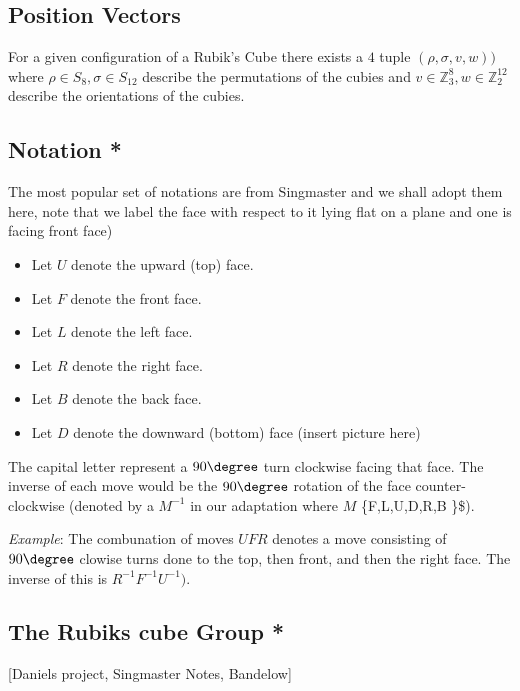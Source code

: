 \subsection{Position Vectors}\label{position-vectors}

For a given configuration of a Rubik's Cube there exists a \(4\) tuple
\((\rho, \sigma, v, w))\) where \(\rho \in S_8, \sigma \in S_{12}\)
describe the permutations of the cubies and
\(v \in \mathbb Z_3^8, w \in \mathbb Z_2^{12}\) describe the
orientations of the cubies.

\subsection{Notation *}\label{notation}

The most popular set of notations are from Singmaster and we shall adopt
them here, note that we label the face with respect to it lying flat on
a plane and one is facing front face)

\begin{itemize}
\tightlist
\item
  Let \(U\) denote the upward (top) face.
\item
  Let \(F\) denote the front face.
\item
  Let \(L\) denote the left face.
\item
  Let \(R\) denote the right face.
\item
  Let \(B\) denote the back face.
\item
  Let \(D\) denote the downward (bottom) face (insert picture here)
\end{itemize}

The capital letter represent a \(90\degree\) turn clockwise facing that
face. The inverse of each move would be the \(90\degree\) rotation of
the face counter-clockwise (denoted by a \(M^{-1}\) in our adaptation
where \(M\) \in \{F,L,U,D,R,B \}\$).

\emph{Example}: The combunation of moves \(UFR\) denotes a move
consisting of \(90\degree\) clowise turns done to the top, then front,
and then the right face. The inverse of this is \(R^{-1}F^{-1}U^{-1})\).

\subsection{The Rubiks cube Group *}\label{the-rubiks-cube-group}

{[}Daniels project, Singmaster Notes, Bandelow{]}


